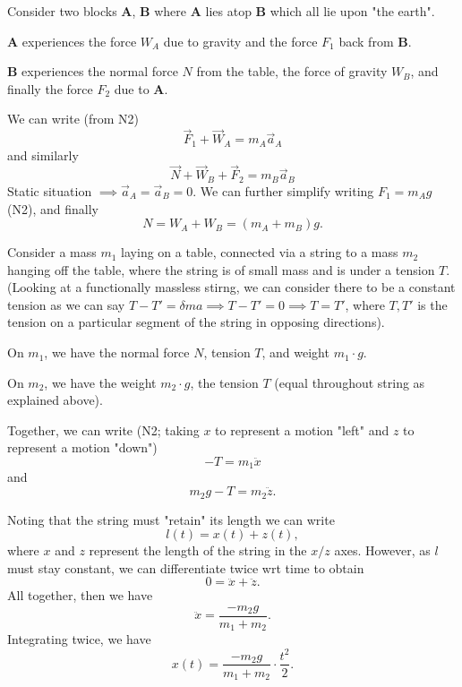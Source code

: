 \documentclass[12pt]{article}
\begin{document}
\begin{example}
  Consider two blocks \textbf{A}, \textbf{B} where \textbf{A} lies atop \textbf{B} which all lie upon "the earth".

  \textbf{A} experiences the force $W_A$ due to gravity and the force $F_1$ back from \textbf{B}.

  \textbf{B} experiences the normal force $N$ from the table, the force of gravity $W_B$, and finally the force $F_2$ due to \textbf{A}.

  We can write (from N2) \[\vec{F}_1 + \vec{W}_A = m_A \vec{a}_A\] and similarly
  \[\vec{N} + \vec{W}_B + \vec{F}_2 = m_B \vec{a}_B\]
  Static situation $\implies \vec{a}_A = \vec{a}_B = 0$.
  We can further simplify writing $F_1 = m_A g$ (N2), and finally \[N = W_A + W_B = (m_A + m_B)g.\]
\end{example}

\begin{example}
  Consider a mass $m_1$ laying on a table, connected via a string to a mass $m_2$ hanging off the table, where the string is of small mass and is under a tension $T$. (Looking at a functionally massless stirng, we can consider there to be a constant tension as we can say $T - T' = \delta m a \implies T - T' = 0 \implies T = T'$, where $T, T'$ is the tension on a particular segment of the string in opposing directions).

  On $m_1$, we have the normal force $N$, tension $T$, and weight $m_1 \cdot g$.

  On $m_2$, we have the weight $m_2 \cdot g$, the tension $T$ (equal throughout string as explained above).

  Together, we can write (N2; taking $x$ to represent a motion "left" and $z$ to represent a motion "down") 
  \[- T = m_1 \ddot{x}\] 
  and 
  \[m_2g-T = m_2 \ddot{z}.\]

  Noting that the string must "retain" its length we can write \[l(t) = x(t) + z(t),\] where $x$ and $z$ represent the length of the string in the $x/z$ axes. However, as $l$ must stay constant, we can differentiate twice wrt time to obtain \[0 = \ddot{x} + \ddot{z}.\]
  All together, then we have
  \[
    \ddot{x} = \frac{-m_2 g}{m_1 + m_2}.
  \]
  Integrating twice, we have \[
    x(t) = \frac{-m_2 g}{m_1 + m_2} \cdot \frac{t^2}{2}.
  \]
\end{example}
\end{document}
